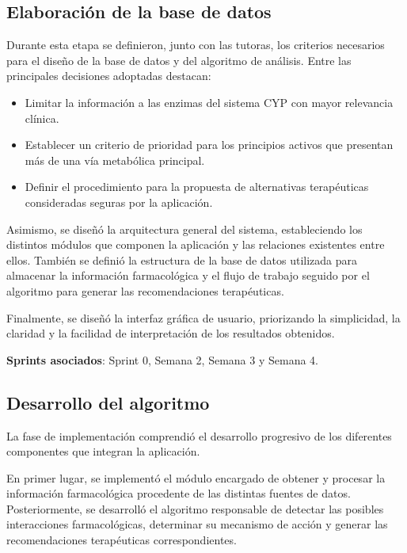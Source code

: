 \subsection*{Elaboración de la base de datos}

Durante esta etapa se definieron, junto con las tutoras, los criterios necesarios para el diseño de la base de datos y del algoritmo de análisis. Entre las principales decisiones adoptadas destacan:

\begin{itemize}
    \item Limitar la información a las enzimas del sistema CYP con mayor relevancia clínica.
    \item Establecer un criterio de prioridad para los principios activos que presentan más de una vía metabólica principal.
    \item Definir el procedimiento para la propuesta de alternativas terapéuticas consideradas seguras por la aplicación.
\end{itemize}

Asimismo, se diseñó la arquitectura general del sistema, estableciendo los distintos módulos que componen la aplicación y las relaciones existentes entre ellos. También se definió la estructura de la base de datos utilizada para almacenar la información farmacológica y el flujo de trabajo seguido por el algoritmo para generar las recomendaciones terapéuticas.

Finalmente, se diseñó la interfaz gráfica de usuario, priorizando la simplicidad, la claridad y la facilidad de interpretación de los resultados obtenidos.

\textbf{Sprints asociados}: Sprint 0, Semana 2, Semana 3 y Semana 4.

\subsection*{Desarrollo del algoritmo}

La fase de implementación comprendió el desarrollo progresivo de los diferentes componentes que integran la aplicación.

En primer lugar, se implementó el módulo encargado de obtener y procesar la información farmacológica procedente de las distintas fuentes de datos. Posteriormente, se desarrolló el algoritmo responsable de detectar las posibles interacciones farmacológicas, determinar su mecanismo de acción y generar las recomendaciones terapéuticas correspondientes.

